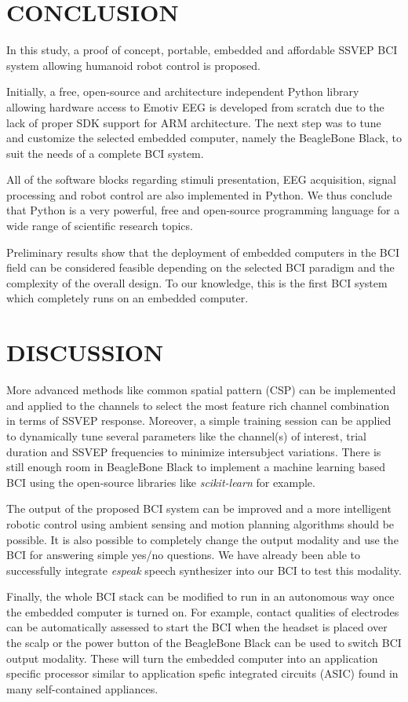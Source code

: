 \documentclass[12pt]{article}
\newcommand\mysection[1]{\vspace*{-0.35cm}\section{#1}\vspace*{6pt}\thispagestyle{empty}}
\numberwithin{equation}{section}
\numberwithin{figure}{section}
\numberwithin{table}{section}
\begin{document}
\clearpage
\vspace*{-0.35cm}
\mysection{CONCLUSION}
\par{
    In this study, a proof of concept, portable, embedded and affordable SSVEP BCI system allowing
    humanoid robot control is proposed.
}
\par{
    Initially, a free, open-source and architecture independent Python library allowing hardware access to Emotiv EEG
    is developed from scratch due to the lack of proper SDK support for ARM architecture.
    The next step was to tune and customize the selected embedded computer, namely the BeagleBone Black, to suit the needs of
    a complete BCI system.
}
\par{
    All of the software blocks regarding stimuli presentation,
    EEG acquisition, signal processing and robot control are also implemented in Python.
    We thus conclude that Python is a very powerful, free and open-source programming language
    for a wide range of scientific research topics.
}
\par{
    Preliminary results show that the deployment of embedded computers in the BCI field can be considered feasible
    depending on the selected BCI paradigm and the complexity of the overall design.
    To our knowledge, this is the first BCI system which completely runs on an embedded
    computer.
}

\clearpage
\vspace*{-0.35cm}
\mysection{DISCUSSION}
\par{
    More advanced methods like common spatial pattern (CSP) can be implemented and
    applied to the channels to select the most feature rich channel combination
    in terms of SSVEP response. Moreover, a simple training session can be applied to
    dynamically tune several parameters like the channel(s) of interest, trial duration and
    SSVEP frequencies to minimize intersubject variations. There is still enough
    room in BeagleBone Black to implement a machine learning based BCI using the open-source
    libraries like \emph{scikit-learn} for example.
}
\par{
    The output of the proposed BCI system can be improved and a more intelligent robotic control
    using ambient sensing and motion planning algorithms should be possible. It is also possible
    to completely change the output modality and use the BCI for answering simple yes/no
    questions. We have already been able to successfully integrate \emph{espeak} speech synthesizer into our
    BCI to test this modality.
}
\par{
    Finally, the whole BCI stack can be modified to run in an autonomous way once the embedded
    computer is turned on. For example, contact qualities of electrodes can be automatically assessed
    to start the BCI when the headset is placed over the scalp or the power button of the BeagleBone Black
    can be used to switch BCI output modality. These will turn the embedded computer into an application specific processor similar to
    application spefic integrated circuits (ASIC) found in many self-contained appliances.
}
\end{document}
